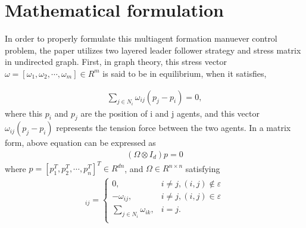 \section{Mathematical formulation} \label{Mathematical_formulation}


 In order to properly formulate this multiagent formation manuever control problem, the paper utilizes two layered leader follower strategy and stress matrix in undirected graph. 
 First, in graph theory, this stress vector $\omega = [\omega_1, \omega_2, \cdots, \omega_m] \in R^m$ is said to be in equilibrium, when it satisfies,

\begin{align*}
    \sum_{j \in N_i} \omega_{ij} (p_j - p_i) = 0, 
\end{align*} 
where this $p_i$ and $p_j$ are the position of i and j agents, and this vector $\omega_{ij} (p_j - p_i)$ represents the tension force between the two agents. In a matrix form, above equation can be expressed as 
\begin{align*}
    (\Omega \otimes  I_d)p = 0
\end{align*} 
where $p = [p_1^T, p_2^T, \cdots, p_n^T]^T \in R^{d n}$, and $\Omega \in R^{n \times n}$ satisfying
\begin{align*}
    [\Omega]_{ij} =  
    \begin{cases}
        0, &i \neq j, (i, j)\notin \varepsilon  \\
        -\omega_{ij}, &i \neq j, (i, j)\in \varepsilon \\
        \sum_{j \in N_i} \omega_{ik}, &i = j. \\    
    \end{cases}
\end{align*} 

